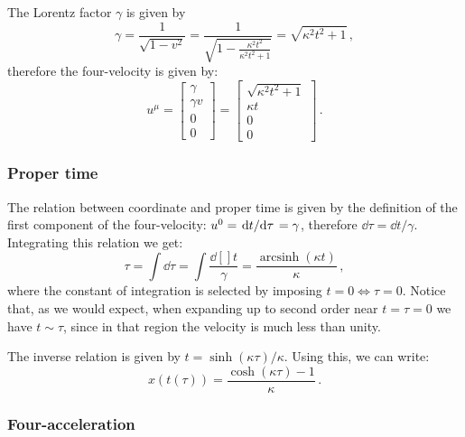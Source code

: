 \documentclass[main.tex]{subfiles}
\begin{document}
The Lorentz factor \(\gamma \) is given by
%
\begin{equation}
  \gamma = \frac{1}{\sqrt{1-v^2}}
  = \frac{1}{\sqrt{1 - \frac{\kappa^{2} t^{2}}{\kappa^{2} t^{2} + 1} }}
  = \sqrt{\kappa^2 t^2 + 1} \,,
\end{equation}
%
therefore the four-velocity is given by:
%
\begin{equation}
  u^{\mu } =
  \begin{bmatrix}
  \gamma  \\
  \gamma v \\
  0 \\
  0
  \end{bmatrix}
  =
  \begin{bmatrix}
    \sqrt{\kappa^2 t^2 + 1}  \\
    \kappa t \\
    0 \\
    0
  \end{bmatrix}\,.
\end{equation}

\subsubsection{Proper time}

The relation between coordinate and proper time is given by the definition of the first component of the four-velocity: \(u^{0} = \dv*{t}{\tau} = \gamma \), therefore \(\dd{\tau } = \dd{t} / \gamma \).
Integrating this relation we get:
%
\begin{equation}
    \tau = \int \dd{\tau } 
    = \int \frac{\dd[]{t} }{\gamma }
    = \displaystyle \frac{\operatorname{arcsinh}{\left(\kappa t \right)}}{\kappa}\,,
\end{equation}
%
where the constant of integration is selected by imposing \(t = 0 \iff \tau = 0\).
Notice that, as we would expect, when expanding up to second order near \(t = \tau = 0 \) we have \(t \sim \tau \), since in that region the velocity is much less than unity.

The inverse relation is given by \(t = \sinh (\kappa \tau ) / \kappa \). Using this, we can write:
%
\begin{equation}
  x (t(\tau ))  =\frac{\cosh{\left(\kappa \tau \right)} - 1}{\kappa}\,.
\end{equation}

\subsubsection{Four-acceleration}
\end{document}
